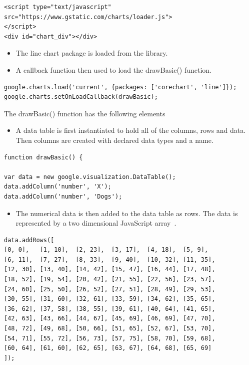 \begin{verbatim}
<script type="text/javascript" src="https://www.gstatic.com/charts/loader.js">
</script>
<div id="chart_div"></div>
\end{verbatim}
\begin{itemize}
	\item The line chart package is loaded from the library.
	\item A callback function then used to load the drawBasic() function.
\end{itemize}
\begin{verbatim}
google.charts.load('current', {packages: ['corechart', 'line']});
google.charts.setOnLoadCallback(drawBasic);
\end{verbatim}
The drawBasic() function has the following elements
\begin{itemize}
	\item A data table is first instantiated to hold all of the columns, rows and data. Then columns are created with declared data types and a name. ~\cite{GoogleLineChart:online}
\end{itemize}
\begin{verbatim}
function drawBasic() {

var data = new google.visualization.DataTable();
data.addColumn('number', 'X');
data.addColumn('number', 'Dogs');

\end{verbatim}
\begin{itemize}
	\item The numerical data is then added to the data table as rows. The data is represented by a two dimensional JavaScript array~\cite{GoogleLineChart:online}.
\end{itemize}
\begin{verbatim}
data.addRows([
[0, 0],   [1, 10],  [2, 23],  [3, 17],  [4, 18],  [5, 9],
[6, 11],  [7, 27],  [8, 33],  [9, 40],  [10, 32], [11, 35],
[12, 30], [13, 40], [14, 42], [15, 47], [16, 44], [17, 48],
[18, 52], [19, 54], [20, 42], [21, 55], [22, 56], [23, 57],
[24, 60], [25, 50], [26, 52], [27, 51], [28, 49], [29, 53],
[30, 55], [31, 60], [32, 61], [33, 59], [34, 62], [35, 65],
[36, 62], [37, 58], [38, 55], [39, 61], [40, 64], [41, 65],
[42, 63], [43, 66], [44, 67], [45, 69], [46, 69], [47, 70],
[48, 72], [49, 68], [50, 66], [51, 65], [52, 67], [53, 70],
[54, 71], [55, 72], [56, 73], [57, 75], [58, 70], [59, 68],
[60, 64], [61, 60], [62, 65], [63, 67], [64, 68], [65, 69]
]);
\end{verbatim}

